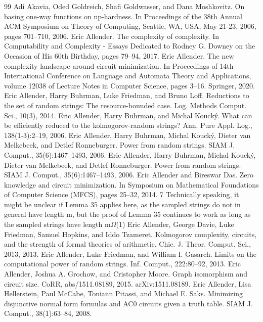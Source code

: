 \documentclass[10pt,a4paper]{article}
\begin{document}
\begin{thebibliography}{99}
 Adi Akavia, Oded Goldreich, Shafi Goldwasser, and Dana Moshkovitz. On basing one-way functions on np-hardness. In Proceedings of the 38th Annual ACM Symposium on Theory of Computing, Seattle, WA, USA, May 21-23, 2006, pages 701–710, 2006.
 Eric Allender. The complexity of complexity. In Computability and Complexity - Essays Dedicated to Rodney G. Downey on the Occasion of His 60th Birthday, pages 79–94, 2017.
 Eric Allender. The new complexity landscape around circuit minimization. In Proceedings of 14th International Conference on Language and Automata Theory and Applications, volume 12038 of Lecture Notes in Computer Science, pages 3–16. Springer, 2020.
 Eric Allender, Harry Buhrman, Luke Friedman, and Bruno Loff. Reductions to the set of random strings: The resource-bounded case. Log. Methods Comput. Sci., 10(3), 2014.
 Eric Allender, Harry Buhrman, and Michal Koucký. What can be efficiently reduced to the kolmogorov-random strings? Ann. Pure Appl. Log., 138(1-3):2–19, 2006.
 Eric Allender, Harry Buhrman, Michal Koucký, Dieter van Melkebeek, and Detlef Ronneburger. Power from random strings. SIAM J. Comput., 35(6):1467–1493, 2006.
 Eric Allender, Harry Buhrman, Michal Koucký, Dieter van Melkebeek, and Detlef Ronneburger. Power from random strings. SIAM J. Comput., 35(6):1467–1493, 2006.
 Eric Allender and Bireswar Das. Zero knowledge and circuit minimization. In Symposium on Mathematical Foundations of Computer Science (MFCS), pages 25–32, 2014. 7 Technically speaking, it might be unclear if Lemma 35 applies here, as the sampled strings do not in general have length m, but the proof of Lemma 35 continues to work as long as the sampled strings have length m$\Omega$(1)
 Eric Allender, George Davie, Luke Friedman, Samuel Hopkins, and Iddo Tzameret. Kolmogorov complexity, circuits, and the strength of formal theories of arithmetic. Chic. J. Theor. Comput. Sci., 2013, 2013.
 Eric Allender, Luke Friedman, and William I. Gasarch. Limits on the computational power of random strings. Inf. Comput., 222:80–92, 2013.
 Eric Allender, Joshua A. Grochow, and Cristopher Moore. Graph isomorphism and circuit size. CoRR, abs/1511.08189, 2015. arXiv:1511.08189.
 Eric Allender, Lisa Hellerstein, Paul McCabe, Toniann Pitassi, and Michael E. Saks. Minimizing disjunctive normal form formulas and AC0 circuits given a truth table. SIAM J. Comput., 38(1):63–84, 2008.

\end{thebibliography}
\end{document}
